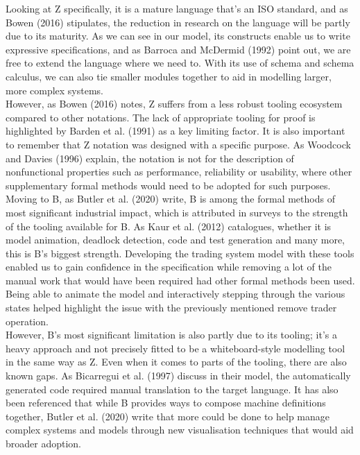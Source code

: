 \documentclass{article}
\begin{document}
Looking at Z specifically, it is a mature language that’s an ISO standard, and as Bowen (2016) stipulates, the reduction in research on the language will be partly due to its maturity. As we can see in our model, its constructs enable us to write expressive specifications, and as Barroca and McDermid (1992) point out, we are free to extend the language where we need to. With its use of schema and schema calculus, we can also tie smaller modules together to aid in modelling larger, more complex systems. \\
\newline
However, as Bowen (2016) notes, Z suffers from a less robust tooling ecosystem compared to other notations. The lack of appropriate tooling for proof is highlighted by Barden et al. (1991) as a key limiting factor. It is also important to remember that Z notation was designed with a specific purpose. As Woodcock and Davies (1996) explain, the notation is not for the description of nonfunctional properties such as performance, reliability or usability, where other supplementary formal methods would need to be adopted for such purposes. \\
\newline
Moving to B, as Butler et al. (2020) write, B is among the formal methods of most significant industrial impact, which is attributed in surveys to the strength of the tooling available for B. As Kaur et al. (2012) catalogues, whether it is model animation, deadlock detection, code and test generation and many more, this is B's biggest strength. Developing the trading system model with these tools enabled us to gain confidence in the specification while removing a lot of the manual work that would have been required had other formal methods been used. Being able to animate the model and interactively stepping through the various states helped highlight the issue with the previously mentioned remove trader operation. \\
\newline
However, B’s most significant limitation is also partly due to its tooling; it’s a heavy approach and not precisely fitted to be a whiteboard-style modelling tool in the same way as Z. Even when it comes to parts of the tooling, there are also known gaps. As Bicarregui et al. (1997) discuss in their model, the automatically generated code required manual translation to the target language. It has also been referenced that while B provides ways to compose machine definitions together, Butler et al. (2020) write that more could be done to help manage complex systems and models through new visualisation techniques that would aid broader adoption.
\pagebreak
\end{document}
